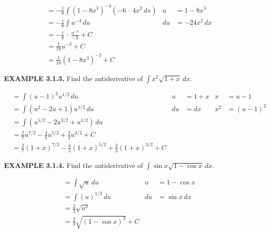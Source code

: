 \documentclass[12pt]{article}
\newcommand{\follow}{\bigskip\noindent}
\newcommand{\point}{\,\cdot\,}
\newcommand{\mins}{-}
\newcommand{\inline}[1]{\({#1}\)}
\begin{document}
        \begin{align*}
            &= \mins{} \frac{1}{6} \int{} {(1 \mins{} 8x^3)}^{\mins{} 4} (\mins{} 6 \point{} 4x^2 \, dx)    & u &= 1 \mins{} 8x^3 \\
            &= \mins{} \frac{1}{6} \int{} u^{\mins{} 4} \, du                                               & du &= \mins{} 24x^2 \, dx \\
            &= \mins{} \frac{1}{6} \point{} \frac{u^{\mins{} 3}}{\mins{} 3} + C \\
            &= \frac{1}{18} u^{\mins{} 3} + C \\
            &= \frac{1}{18} {(1 \mins{} 8x^3)}^{\mins{} 3} + C
        \end{align*}
        
        \newpage\follow\textbf{EXAMPLE 3.1.3.}
        Find the antiderivative of \inline{\int{} x^2 \sqrt{1 + x} \, dx}.

        \begin{align*}
            &= \int{} {(u \mins{} 1)}^2 u^{1/2} \, du                                                               & u &= 1 + x        & x &= u \mins{} 1 \\
            &= \int{} {(u^2 \mins{} 2u + 1)} u^{1/2} \, du                                                          & du &= dx          & x^2 &= {(u \mins{} 1)}^2 \\
            &= \int{} (u^{5/2} \mins{} 2u^{3/2} + u^{1/2}) \, du                                                    \\
            &= \frac{2}{7} u^{7/2} \mins{} \frac{4}{5} u^{5/2} + \frac{2}{3} u^{3/2} + C                            \\
            &= \frac{2}{7} {(1 + x)}^{7/2} \mins{} \frac{4}{5} {(1 + x)}^{5/2} + \frac{2}{3} {(1 + x)}^{3/2} + C
        \end{align*}

        \follow\textbf{EXAMPLE 3.1.4.}
        Find the antiderivative of \inline{\int{} \sin{x} \sqrt{1 \mins{} \cos{x}} \, dx}.

        \begin{align*}
            &= \int{} \sqrt{u} \, du    & u &= 1 \mins{} \cos{x} \\
            &= \int{} {(u)}^{1/2} \, du & du &= \sin{x} \, dx \\
            &= \frac{2}{3} \sqrt{u^3} \\
            &= \frac{2}{3} \sqrt{{(1 \mins{} \cos{x})}^3} + C
        \end{align*}
\end{document}
